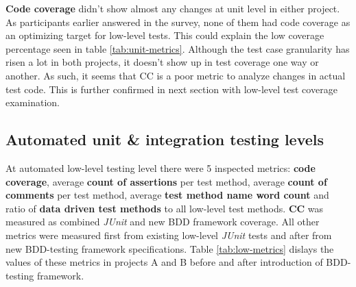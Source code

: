 \textbf{Code coverage} didn't show almost any changes at unit level in either project. As participants earlier answered in the survey, none
of them had code coverage as an optimizing target for low-level tests. This could explain the low coverage percentage seen in
table \ref{tab:unit-metrics}. Although the test case granularity has risen a lot in both projects, it doesn't
show up in test coverage one way or another. As such, it seems that CC is a poor metric to analyze changes in actual test
code. This is further confirmed in next section with low-level test coverage examination.

\subsection{Automated unit \& integration testing levels}
\label{subsub:low-level-metrics}
At automated low-level testing level there were 5 inspected metrics: \textbf{code coverage}, average \textbf{count of assertions} per test method,
average \textbf{count of comments} per test method, average \textbf{test method name word count} and ratio of \textbf{data driven test methods} to
all low-level test methods. \textbf{CC} was measured as combined \textit{JUnit} and new BDD framework coverage. All other metrics
were measured first from existing low-level \textit{JUnit} tests and after from new BDD-testing framework specifications.
Table \ref{tab:low-metrics} dislays the values of these metrics in projects A and B before and after introduction of BDD-testing framework.


